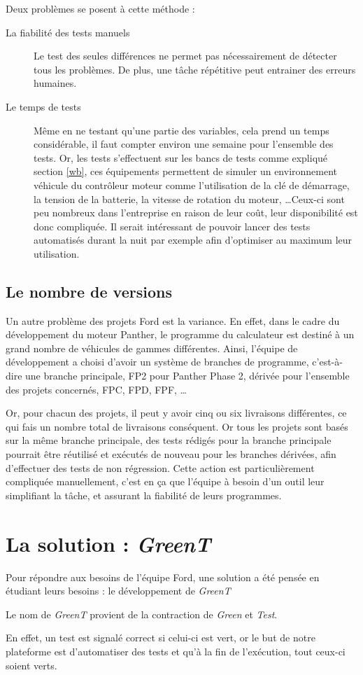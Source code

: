 	\vspace{20px}
	Deux problèmes se posent à cette méthode : 
	\begin{description}
		\item[La fiabilité des tests manuels] Le test des seules différences ne permet pas nécessairement de détecter tous les problèmes. De plus, une tâche répétitive peut entrainer des erreurs humaines.
		\item[Le temps de tests] Même en ne testant qu'une partie des variables, cela prend un temps considérable, il faut compter environ une semaine pour l'ensemble des tests.\newline
			Or, les tests s'effectuent sur les bancs de tests comme expliqué section \ref{wb}, ces équipements permettent de simuler un environnement véhicule du contrôleur moteur comme
			l'utilisation de la clé de démarrage, la tension de la batterie, la vitesse de rotation du moteur, \ldots Ceux-ci sont peu
			nombreux dans l'entreprise en raison de leur coût, leur disponibilité est donc compliquée. Il serait intéressant de pouvoir lancer
			des tests automatisés durant la nuit par exemple afin d'optimiser au maximum leur utilisation.
	\end{description}
	
	\subsection{Le nombre de versions}
	Un autre problème des projets Ford est la variance. En effet, dans le cadre du développement du moteur Panther, le programme du calculateur est destiné à un grand nombre de véhicules de gammes différentes. Ainsi, l'équipe de développement a choisi d'avoir un système de branches de programme, c'est-à-dire une branche principale, FP2 pour Panther Phase 2, dérivée pour l'ensemble des projets concernés, FPC, FPD, FPF, \ldots
	
	Or, pour chacun des projets, il peut y avoir cinq ou six livraisons différentes, ce qui fais un nombre total de livraisons conséquent. Or tous les projets sont basés sur la même branche principale, des tests rédigés pour la branche principale pourrait être réutilisé et exécutés de nouveau pour les branches dérivées, afin d'effectuer des tests de non régression. Cette action est particulièrement compliquée manuellement, c'est en ça que l'équipe à besoin d'un outil leur simplifiant la tâche, et assurant la fiabilité de leurs programmes.
	
	\section{La solution : \textit{GreenT}}
	Pour répondre aux besoins de l'équipe Ford, une solution a été pensée en étudiant leurs besoins : le développement de \textit{GreenT}
	\begin{remarque}
		Le nom de \textit{GreenT} provient de la contraction de \textit{Green} et \textit{Test}.
		
		En effet, un test est signalé correct si celui-ci est vert, or le but de notre plateforme est d'automatiser des tests et qu'à la fin de l'exécution, tout ceux-ci soient verts.
	\end{remarque}
	
